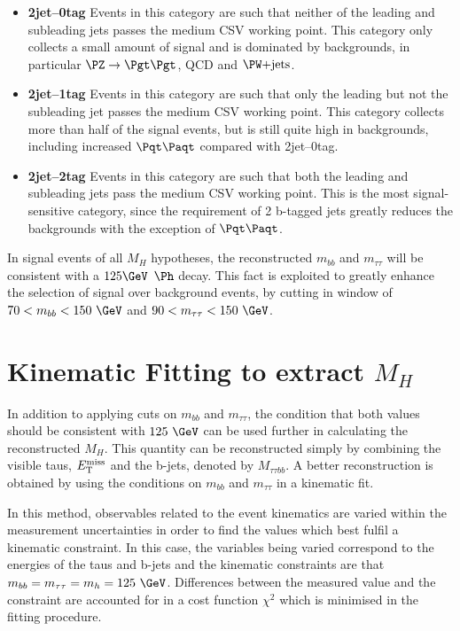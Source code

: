 \begin{itemize}
\item \textbf{2jet--0tag} 
Events in this category are such that neither of the leading and subleading jets
passes the medium \ac{CSV} working point. This category only collects a small amount
of signal and is dominated by backgrounds, in particular $\ZToTauTau$, QCD and
$\WJets$.
\item \textbf{2jet--1tag} 
Events in this category are such that only the leading but not the subleading jet
passes the medium \ac{CSV} working point. This category collects more than half of
the signal events, but is still quite high in backgrounds, including increased
$\ttbar$ compared with 2jet--0tag.
\item \textbf{2jet--2tag} 
Events in this category are such that both the leading and subleading jets
pass the medium \ac{CSV} working point. This is the most signal-sensitive category,
since the requirement of 2 b-tagged jets greatly reduces the backgrounds with
the exception of $\ttbar$.  
\end{itemize}







In signal events of all $M_{H}$ hypotheses, the reconstructed $m_{bb}$ and
$m_{\tau\tau}$ will be consistent with a $125 \GeV$ $\Ph$ decay. This fact is exploited to greatly
enhance the selection of signal over background events, by cutting in window of
$70 < m_{bb} < 150~\GeV$ and $90 < m_{\tau\tau} < 150~\GeV$. 

\section{Kinematic Fitting to extract $M_{H}$}

In addition to applying cuts on $m_{bb}$ and $m_{\tau\tau}$, the condition that
both values should be consistent with $125~\GeV$ can be used further in
calculating the reconstructed $M_{H}$. This quantity can be reconstructed simply
by combining the visible taus, $E_{\mathrm{T}}^{\text{miss}}$ and the b-jets, denoted by $M_{\tau\tau bb}$.
A better reconstruction is obtained by using the conditions on $m_{bb}$ and
$m_{\tau\tau}$ in a kinematic fit. 

In this method, observables related to the
event kinematics are varied within the measurement uncertainties in order to
find the values which best fulfil a kinematic constraint. In this case, the
variables being varied correspond to the energies of the taus and b-jets and the
kinematic constraints are that $m_{bb} = m_{\tau\tau} = m_{h} = 125~\GeV$. Differences
between the measured value and the constraint are accounted for in a cost
function $\chi^{2}$ which is minimised in the fitting procedure.  

